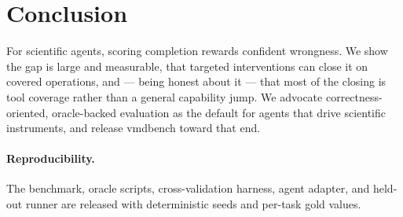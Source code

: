 \documentclass[11pt]{article}
\begin{document}
\section{Conclusion}
For scientific agents, scoring completion rewards confident wrongness. We show the gap is large
and measurable, that targeted interventions can close it on covered operations, and --- being
honest about it --- that most of the closing is tool coverage rather than a general capability
jump. We advocate correctness-oriented, oracle-backed evaluation as the default for agents that
drive scientific instruments, and release vmdbench toward that end.

\paragraph{Reproducibility.} The benchmark, oracle scripts, cross-validation harness, agent
adapter, and held-out runner are released with deterministic seeds and per-task gold values.
\end{document}

